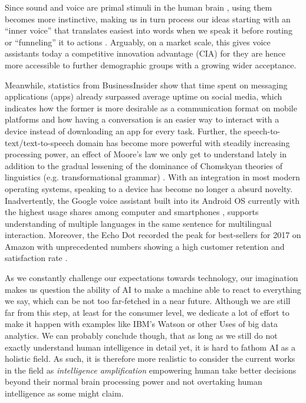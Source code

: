 Since sound and voice are primal stimuli in the human brain \cite{voiceneurons}, using them becomes more instinctive, making us in turn process our ideas starting with an ``inner voice'' that translates easiest into words when we speak it before routing or ``funneling'' it to actions \cite{alexapc18}.
Arguably, on a market scale, this gives voice assistants today a competitive innovation advantage (CIA) for they are hence more accessible to further demographic groups with a growing wider acceptance.

Meanwhile, statistics from BusinessInsider \cite{businsider} show that time spent on messaging applications (apps) already surpassed average uptime on social media, which indicates how the former is more desirable as a communication format on mobile platforms and how having a conversation is an easier way to interact with a device instead of downloading an app for every task. %
Further, the speech-to-text/text-to-speech domain has become more powerful with steadily increasing processing power, an effect of Moore's law we only get to understand lately in addition to the gradual lessening of the dominance of Chomskyan theories of linguistics (e.g. transformational grammar) \cite{wiki:nlp}.
With an integration in most modern operating systems, speaking to a device has become no longer a absurd novelty. 
Inadvertently, the Google voice assistant built into its Android OS currently with the highest usage shares among computer and smartphones \cite{wiki:gartnerreports}, supports understanding of multiple languages in the same sentence for multilingual interaction. %
Moreover, the Echo Dot recorded the peak for best-sellers for 2017 on Amazon with unprecedented numbers showing a high customer retention and satisfaction rate \cite{cnbcAlexa}.

As we constantly challenge our expectations towards technology, our imagination makes us question the ability of AI to make a machine able to react to everything we say, which can be not too far-fetched in a near future.
Although we are still far from this step, at least for the consumer level, we dedicate a lot of effort to make it happen with examples like IBM's Watson or other Uses of big data analytics.
We can probably conclude though, that as long as we still do not exactly understand human intelligence in detail yet, it is hard to fathom AI as a holistic field. As such, it is therefore more realistic to consider the current works in the field as \textit{intelligence amplification} \cite{alexapc18} empowering human take better decisions beyond their normal brain processing power and not overtaking human intelligence as some might claim.


